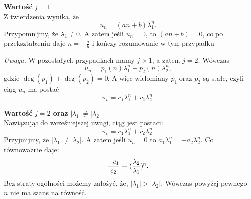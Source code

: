 \documentclass[leqno,10pt]{article}
\begin{document}
\textbf{Wartość $j=1$}\\
Z twierdzenia wynika, że
\[
u_n = (an+b) \lambda_1^n.
\]
Przypomnijmy, że $\lambda_1 \neq 0$.
A zatem jeśli $u_n = 0$, to $(an+b) = 0$, co po przekształceniu daje $n = -\frac{a}{b}$ i kończy rozumowanie w tym przypadku.

\textit{Uwaga.}
W pozostałych przypadkach mamy $j > 1$, a zatem $j = 2$. Wówczas
\[
u_n = p_1(n) \lambda_1^n + p_2(n) \lambda_2^n,
\]
gdzie $\deg(p_1) + \deg(p_2) = 0$. A więc wielomiany $p_1$ oraz $p_2$ są stałe, czyli ciąg $u_n$ ma postać
\[
u_n = c_1 \lambda_1^n + c_2 \lambda_2^n.
\]

\textbf{Wartość $j=2$ oraz $|\lambda_1| \neq |\lambda_2|$}\\
Nawiązując do wcześniejszej uwagi, ciąg jest postaci:
\[
    u_n = c_1 \lambda_1^{n} + c_2 \lambda_{2}^n.
\]
Przyjmijmy, że $|\lambda_1| \neq |\lambda_2|$. A zatem jeśli $u_n = 0$ to $a_1 \lambda_1^n = - a_2 \lambda_2^n$. Co równoważnie daje:
\[
    \frac{-c_1}{c_2} = (\large\frac{\lambda_2}{\lambda_1})^{n}.
\]
Bez straty ogólności możemy założyć, że, $|\lambda_1|>|\lambda_2|$. Wówczas powyżej pewnego $n$ nie ma szans na równość. 



 

\end{document}
